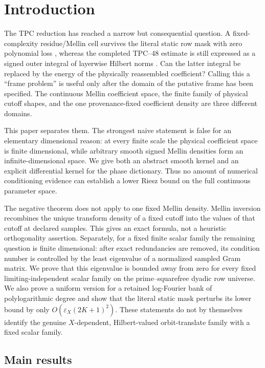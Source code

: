\section{Introduction}
\label{sec:tpc51-introduction}

The TPC reduction has reached a narrow but consequential question.  A
fixed-complexity residue/Mellin cell survives the literal static row
mask with zero polynomial loss \citep{WangTPC50}, whereas the completed
TPC--48 estimate is still expressed as a signed outer integral of
layerwise Hilbert norms \citep{WangTPC48}.  Can the latter integral be
replaced by the energy of the physically reassembled coefficient?
Calling this a ``frame problem'' is useful only after the domain of the
putative frame has been specified.  The continuous Mellin coefficient
space, the finite family of physical cutoff shapes, and the one
provenance-fixed coefficient density are three different domains.

This paper separates them.  The strongest naive statement is false for
an elementary dimensional reason: at every finite scale the physical
coefficient space is finite dimensional, while arbitrary smooth signed
Mellin densities form an infinite-dimensional space.  We give both an
abstract smooth kernel and an explicit differential kernel for the
phase dictionary.  Thus no amount of numerical conditioning evidence
can establish a lower Riesz bound on the full continuous parameter
space.

The negative theorem does not apply to one fixed Mellin density.
Mellin inversion recombines the unique transform density of a fixed
cutoff into the values of that cutoff at declared samples.  This gives
an exact formula, not a heuristic orthogonality assertion.  Separately,
for a fixed finite scalar family the remaining question is finite
dimensional: after exact redundancies are removed, its condition number
is controlled by the least eigenvalue of a normalized sampled Gram
matrix.  We prove that this eigenvalue is bounded away from zero for
every fixed limiting-independent scalar family on the
prime--squarefree dyadic row universe.  We also prove a uniform version
for a retained log-Fourier bank of polylogarithmic degree and show that
the literal static mask perturbs its lower bound by only
\(O(\varepsilon_X(2K+1)^2)\).  These statements do not by themselves
identify the genuine \(X\)-dependent, Hilbert-valued orbit-translate
family with a fixed scalar family.

\subsection{Main results}

